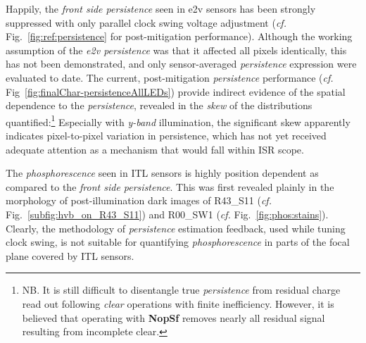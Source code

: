Happily, the {\it front side persistence} seen in e2v sensors has been strongly suppressed with only parallel clock swing voltage adjustment ({\it cf.} Fig.~\ref{fig:ref:persistence} for post-mitigation performance). Although the working assumption of the {\it e2v persistence} was that it affected all pixels identically, this has not been demonstrated, and only sensor-averaged {\it persistence} expression were evaluated to date. The current, post-mitigation {\it persistence} performance ({\it cf.} Fig~\ref{fig:finalChar-persistenceAllLEDs}) provide indirect evidence of the spatial dependence to the {\it persistence}, revealed in the {\it skew} of the distributions quantified:\footnote{NB. It is still difficult to disentangle true {\it persistence} from residual charge read out following {\it clear} operations with finite inefficiency. However, it is believed that operating with {\bf NopSf} removes nearly all residual signal resulting from incomplete clear.} Especially with {\it y-band} illumination, the significant skew apparently indicates pixel-to-pixel variation in persistence, which has not yet received adequate attention as a mechanism that would fall within ISR scope.

The {\it phosphorescence} seen in ITL sensors is highly position dependent as compared to the {\it front side persistence}. This was first revealed plainly in the morphology of post-illumination dark images of R43\_S11 ({\it cf.} Fig.~\ref{subfig:hvb_on_R43_S11}) and R00\_SW1 ({\it cf.} Fig.~\ref{fig:phos:stains}). Clearly, the methodology of {\it persistence} estimation feedback, used while tuning clock swing, is not suitable for quantifying {\it phosphorescence} in parts of the focal plane covered by ITL sensors.

